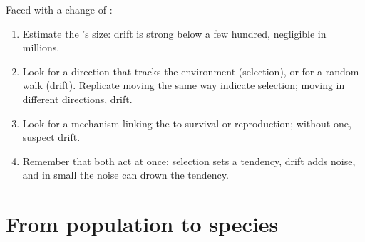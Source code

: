 \begin{method}\label{met:g12:selection-drift-speciation:which}
Faced with a change of :
\begin{enumerate}
  \item Estimate the 's size: drift is strong below a few
        hundred, negligible in millions.
  \item Look for a direction that tracks the environment (selection),
        or for a random walk (drift). Replicate  moving the
        same way indicate selection; moving in different directions,
        drift.
  \item Look for a mechanism linking the  to survival or
        reproduction; without one, suspect drift.
  \item Remember that both act at once: selection sets a tendency,
        drift adds noise, and in small  the noise can drown
        the tendency.
\end{enumerate}
\end{method}

\section{From population to species}

